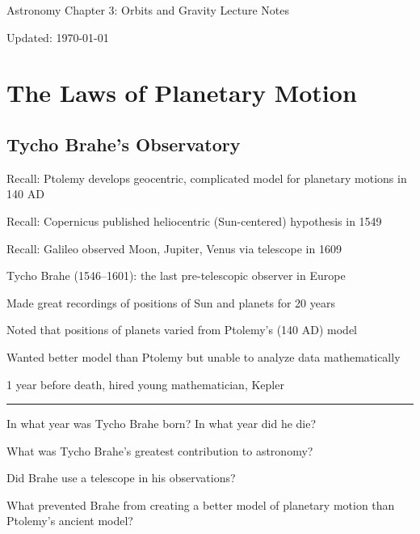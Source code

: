 \documentclass{article}
\begin{document}
Astronomy \hfill Chapter 3: Orbits and Gravity \hfill Lecture Notes
\vspace{-5pt}

\hfill {\footnotesize Updated: \today}

\vspace{-1em}

\section*{The Laws of Planetary Motion}

\subsection*{Tycho Brahe's Observatory}

Recall: Ptolemy develops geocentric, complicated model for planetary motions in 140 AD

Recall: Copernicus published heliocentric (Sun-centered) hypothesis in 1549

Recall: Galileo observed Moon, Jupiter, Venus via telescope in 1609

Tycho Brahe (1546--1601): the last pre-telescopic observer in Europe

Made great recordings of positions of Sun and planets for 20 years

Noted that positions of planets varied from Ptolemy's (140 AD) model

Wanted better model than Ptolemy but unable to analyze data mathematically

1 year before death, hired young mathematician, Kepler
\vspace{5pt}

\hrule

\begin{problem}
    In what year was Tycho Brahe born? In what year did he die?
\end{problem}

\begin{problem}
    What was Tycho Brahe's greatest contribution to astronomy?
\end{problem}

\begin{problem}
    Did Brahe use a telescope in his observations?
\end{problem}

\begin{problem}
    What prevented Brahe from creating a better model of planetary motion than Ptolemy's ancient model?
\end{problem}
\end{document}
